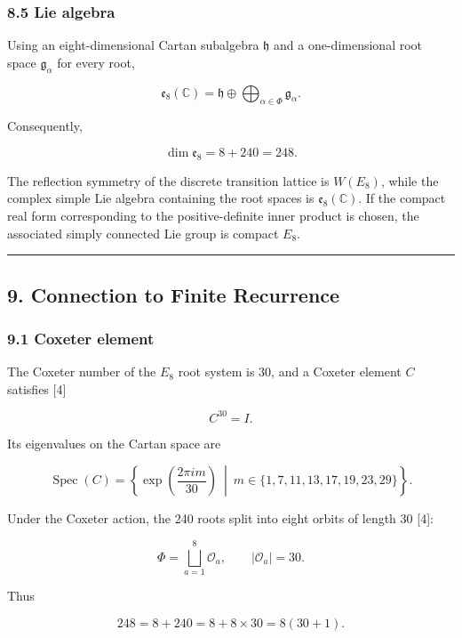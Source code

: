 \documentclass[
  a4paper,
]{article}
\begin{document}
\subsubsection{8.5 Lie algebra}\label{lie-algebra}

Using an eight-dimensional Cartan subalgebra \(\mathfrak h\) and a
one-dimensional root space \(\mathfrak g_\alpha\) for every root,

\[
\mathfrak e_8(\mathbb C)
=
\mathfrak h
\oplus
\bigoplus_{\alpha\in\Phi}
\mathfrak g_\alpha.
\]

Consequently,

\[
\boxed{
\dim\mathfrak e_8
=
8+240
=248.
}
\]

The reflection symmetry of the discrete transition lattice is
\(W(E_8)\), while the complex simple Lie algebra containing the root
spaces is \(\mathfrak e_8(\mathbb C)\). If the compact real form
corresponding to the positive-definite inner product is chosen, the
associated simply connected Lie group is compact \(E_8\).

\begin{center}\rule{0.5\linewidth}{0.5pt}\end{center}

\subsection{9. Connection to Finite
Recurrence}\label{connection-to-finite-recurrence}

\subsubsection{9.1 Coxeter element}\label{coxeter-element}

The Coxeter number of the \(E_8\) root system is 30, and a Coxeter
element \(C\) satisfies {[}4{]}

\[
\boxed{
C^{30}=I.
}
\]

Its eigenvalues on the Cartan space are

\[
\operatorname{Spec}(C)
=
\left\{
\exp
\left(
\frac{2\pi i m}{30}
\right)
\ \middle|\
m\in
\{1,7,11,13,17,19,23,29\}
\right\}.
\]

Under the Coxeter action, the 240 roots split into eight orbits of
length 30 {[}4{]}:

\[
\Phi
=
\bigsqcup_{a=1}^{8}
\mathcal O_a,
\qquad
|\mathcal O_a|
=30.
\]

Thus

\[
\boxed{
248
=
8+240
=
8+8\times30
=
8(30+1).
}
\]
\end{document}
